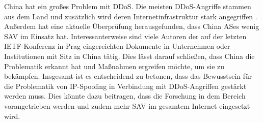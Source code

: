 \documentclass[sigplan,screen]{acmart}
\begin{document}
China hat ein großes Problem mit DDoS. Die meisten DDoS-Angriffe stammen aus dem Land \cite{technode01} und zusätzlich wird deren Internetinfrastruktur stark angegriffen \cite{cloudflaeDDoS01}. Außerdem hat eine aktuelle Überprüfung \cite{largemeasurment01} herausgefunden, dass China ASes wenig SAV im Einsatz hat. Interessanterweise sind viele Autoren der auf der letzten IETF-Konferenz in Prag eingereichten Dokumente in Unternehmen oder Institutionen mit Sitz in China tätig. Dies lässt darauf schließen, dass China die Problematik erkannt hat und Maßnahmen ergreifen möchte, um sie zu bekämpfen.
Insgesamt ist es entscheidend zu betonen, dass das Bewusstsein für die Problematik von IP-Spoofing in Verbindung mit DDoS-Angriffen gestärkt werden muss. Dies könnte dazu beitragen, dass die Forschung in dem Bereich vorangetrieben werden und zudem mehr SAV im gesamtem Internet eingesetzt wird.




\appendix
\end{document}
